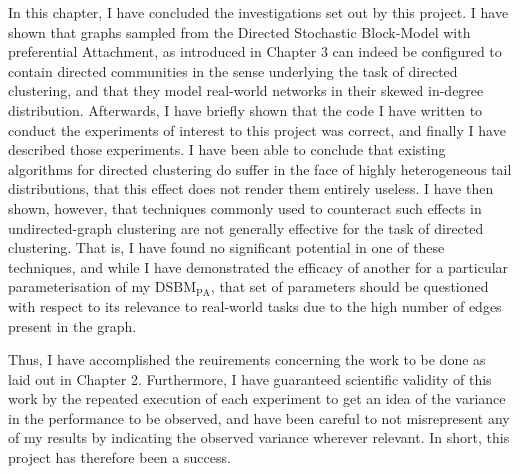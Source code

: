 In this chapter, I have concluded the investigations set out by this project. I have shown that 
graphs sampled from the Directed Stochastic Block-Model with preferential Attachment, as 
introduced in Chapter 3 can indeed be configured to contain directed communities in the sense 
underlying the task of directed clustering, and that they model real-world networks in their 
skewed in-degree distribution. Afterwards, I have briefly shown that the code I have written to 
conduct the experiments of interest to this project was correct, and finally I have described 
those experiments. I have been able to conclude that existing algorithms for directed clustering 
do suffer in the face of highly heterogeneous tail distributions, that this effect does not render 
them entirely useless. I have then shown, however, that techniques commonly used to counteract 
such effects in undirected-graph clustering are not generally effective for the task of directed 
clustering. That is, I have found no significant potential in one of these techniques, and while I 
have demonstrated the efficacy of another for a particular parameterisation of my $\mathrm{DSBM}_{
\mathrm{PA}}$, that set of parameters should be questioned with respect to its relevance to
 real-world tasks due to the high number of edges present in the graph. 

 Thus, I have accomplished the reuirements concerning the work to be done as laid out in Chapter 2.
 Furthermore, I have guaranteed scientific validity of this work by the repeated execution of each 
 experiment to get an idea of the variance in the performance to be observed, and have been 
 careful to not misrepresent any of my results by indicating the observed variance wherever 
 relevant. In short, this project has therefore been a success.
